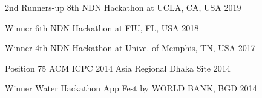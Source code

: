 



\begin{cvhonors}

  \cvhonor
    {2nd Runners-up} %
    {8th NDN Hackathon at UCLA, CA, USA} %
    {2019} %

  \cvhonor
    {Winner} %
    {6th NDN Hackathon at FIU, FL, USA} %
    {2018} %

  \cvhonor
    {Winner} %
    {4th NDN Hackathon at Unive. of Memphis, TN, USA} %
    {2017} %

  \cvhonor
    {Position 75} %
    {ACM ICPC 2014 Asia Regional Dhaka Site} %
    {2014} %


  \cvhonor
    {Winner} %
    {Water Hackathon App Fest by WORLD BANK, BGD} %
    {2014} %



\end{cvhonors}


